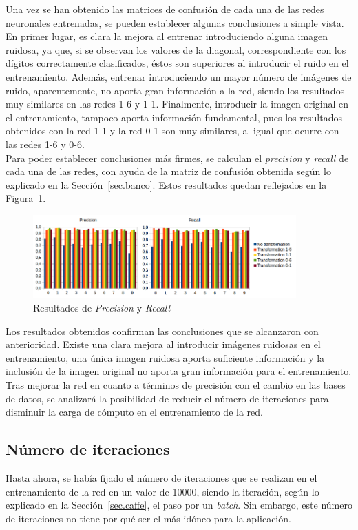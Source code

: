 Una vez se han obtenido las matrices de confusión de cada una de las redes neuronales entrenadas, se pueden establecer algunas conclusiones a simple vista. En primer lugar, es clara la mejora al entrenar introduciendo alguna imagen ruidosa, ya que, si se observan los valores de la diagonal, correspondiente con los dígitos correctamente clasificados, éstos son superiores al introducir el ruido en el entrenamiento. Además, entrenar introduciendo un mayor número de imágenes de ruido, aparentemente, no aporta gran información a la red, siendo los resultados muy similares en las redes 1-6 y 1-1. Finalmente, introducir la imagen original en el entrenamiento, tampoco aporta información fundamental, pues los resultados obtenidos con la red 1-1 y la red 0-1 son muy similares, al igual que ocurre con las redes 1-6 y 0-6.\\

Para poder establecer conclusiones más firmes, se calculan el \textit{precision} y \textit{recall} de cada una de las redes, con ayuda de la matriz de confusión obtenida según lo explicado en la Sección~\ref{sec.banco}. Estos resultados quedan reflejados en la Figura~\ref{fig.precision-recall}.
\begin{figure}[H]
	\centering
	\includegraphics[width=0.9\textwidth]{figures/precision-recall}
	\caption{Resultados de \textit{Precision} y \textit{Recall}}
	\label{fig.precision-recall}
\end{figure}
Los resultados obtenidos confirman las conclusiones que se alcanzaron con anterioridad. Existe una clara mejora al introducir imágenes ruidosas en el entrenamiento, una única imagen ruidosa aporta suficiente información y la inclusión de la imagen original no aporta gran información para el entrenamiento.\\

Tras mejorar la red en cuanto a términos de precisión con el cambio en las bases de datos, se analizará la posibilidad de reducir el número de iteraciones para disminuir la carga de cómputo en el entrenamiento de la red.\\

\subsection{Número de iteraciones}
Hasta ahora, se había fijado el número de iteraciones que se realizan en el entrenamiento de la red en un valor de 10000, siendo la iteración, según lo explicado en la Sección~\ref{sec.caffe}, el paso por un \textit{batch}. Sin embargo, este número de iteraciones no tiene por qué ser el más idóneo para la aplicación.\\

